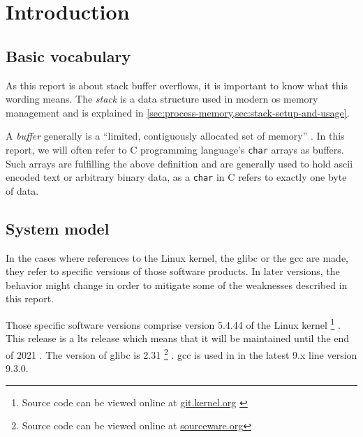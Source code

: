 \chapter{Introduction}
\label{chp:introduction}


\section{Basic vocabulary}
As this report is about stack buffer overflows, it is important to know what this wording means.
The \emph{stack} is a data structure used in modern \gls{os} memory management and is explained in \cref{sec:process-memory,sec:stack-setup-and-usage}.

A \emph{buffer} generally is a ``limited, contiguously allocated set of memory'' \cite[12]{Anley2007}.
In this report, we will often refer to C programming language's \texttt{char} arrays as buffers.
Such arrays are fulfilling the above definition and are generally used to hold \gls{ascii} encoded text or arbitrary binary data, as a \texttt{char} in C refers to exactly one byte of data.

\section{System model}
\label{sec:system-model}

In the cases where references to the Linux kernel, the \gls{glibc} or the \gls{gcc} are made, they refer to specific versions of those software products.
In later versions, the behavior might change in order to mitigate some of the weaknesses described in this report.

Those specific software versions comprise version 5.4.44 of the Linux kernel%
	\footnote{Source code can be viewed online at \href{https://git.kernel.org/stable/h/v5.4.44}{git.kernel.org} \cite{LKD2020}}%
.
This release is a \gls{lts} release which means that it will be maintained until the end of 2021 \cite{LKO2020}.
The version of \gls{glibc} is 2.31%
	\footnote{Source code can be viewed online at \href{https://sourceware.org/git/?p=glibc.git;a=tree;h=6ee690ef6fa36bf79d2e05b5a30a4f7e10ba3937;hb=9ea3686266dca3f004ba874745a4087a89682617}{sourceware.org}}%
.
\gls{gcc} is used in in the latest 9.x line version 9.3.0.

